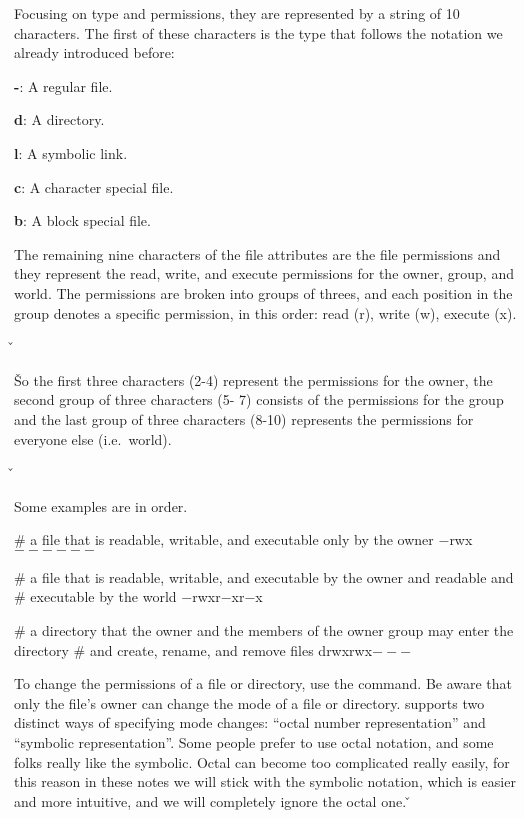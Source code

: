 \newpage

Focusing on type and permissions, they are represented by a string of 10 characters. The first of these characters is
the type that follows the notation we already introduced before:
\bit
\item \textbf{-}: A regular file.
\item \textbf{d}: A directory.
\item \textbf{l}: A symbolic link.
\item \textbf{c}: A character special file.
\item \textbf{b}: A block special file.
\eit

The remaining nine characters of the file attributes are the file permissions and they represent the read, write, and
execute permissions for the owner, group, and world. The permissions are broken into groups of threes, and each
position in the group denotes a specific permission, in this order: read (r), write (w), execute (x).

\v


\v

So the first three characters (2-4) represent the permissions for the owner, the second group of three characters (5-
7) consists of the permissions for the group and the last group of three characters (8-10) represents the permissions
for everyone else (i.e.\ world).

\v


Some examples are in order.

\be
\begin{bash}
# a file that is readable, writable, and executable only by the owner
$-$rwx$------$
\end{bash}

\begin{bash}
# a file that is readable, writable, and executable by the owner and readable and
# executable by the world
$-$rwxr$-$xr$-$x
\end{bash}

\begin{bash}
# a directory that the owner and the members of the owner group may enter the directory
# and create, rename, and remove files
drwxrwx$---$
\end{bash}
\ee

To change the permissions of a file or directory, use the  command. Be aware that only the file's owner
can change the mode of a file or directory.  supports two distinct ways of specifying mode changes:
``octal number representation'' and ``symbolic representation''. Some people prefer to use octal notation, and some
folks really like the symbolic. Octal can become too complicated really easily, for this reason in these notes we
will stick with the symbolic notation, which is easier and more intuitive, and we will completely ignore the octal one.
\v


